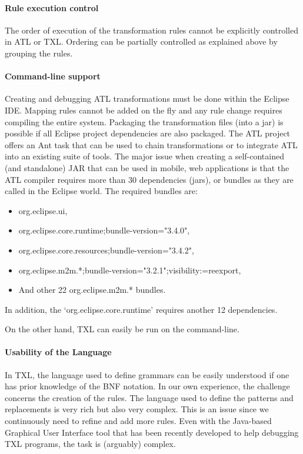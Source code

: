 \paragraph*{Rule execution control} 

The order of execution of the transformation rules cannot be explicitly controlled in ATL or TXL. Ordering can be partially controlled as explained above by grouping the rules.

\paragraph*{Command-line support} 

Creating and debugging ATL transformations must be done within the Eclipse IDE. Mapping rules cannot be added on the fly and any rule change requires compiling the entire system. Packaging the transformation files (into a jar) is possible if all Eclipse project dependencies are also packaged. The ATL project offers an Ant task that can be used to chain transformations or to integrate ATL into an existing suite of tools. The major issue when creating a self-contained (and standalone) JAR that can be used in mobile, web applications is that the ATL compiler requires more than 30 dependencies (jars), or bundles as they are called in the Eclipse world. The required bundles are:

\begin{itemize}
\item org.eclipse.ui,
\item org.eclipse.core.runtime;bundle-version="3.4.0",
\item org.eclipse.core.resources;bundle-version="3.4.2",
\item org.eclipse.m2m.*;bundle-version="3.2.1";visibility:=reexport,
\item And other 22 org.eclipse.m2m.* bundles.
\end{itemize}

In addition, the `org.eclipse.core.runtime' requires another 12 dependencies. 

On the other hand, TXL can easily be run on the command-line. 

\paragraph*{Usability of the Language} 

In TXL, the language used to define grammars can be easily understood if one has prior knowledge of the BNF notation. In our own experience, the challenge concerns the creation of the rules. The language used to define the patterns and replacements is very rich but also very complex. This is an issue since we continuously need to refine and add more rules. Even with the Java-based Graphical User Interface tool that has been recently developed to help debugging TXL programs, the task is (arguably) complex. 

